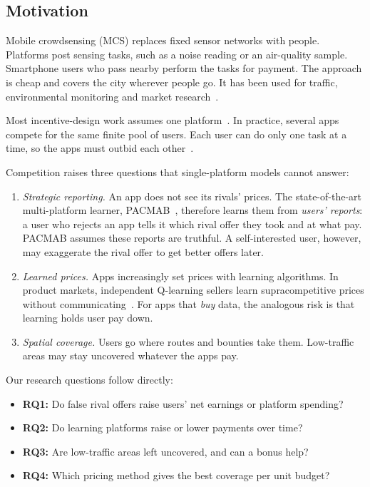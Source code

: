 \documentclass[12pt,draftcls,onecolumn]{IEEEtran}
\begin{document}
\subsection{Motivation}
Mobile crowdsensing (MCS) replaces fixed sensor networks with people. Platforms post sensing tasks, such as a noise reading or an air-quality sample. Smartphone users who pass nearby perform the tasks for payment. The approach is cheap and covers the city wherever people go. It has been used for traffic, environmental monitoring and market research~\cite{li2021mp}.

Most incentive-design work assumes one platform~\cite{yang2012crowdsourcing}. In practice, several apps compete for the same finite pool of users. Each user can do only one task at a time, so the apps must outbid each other~\cite{li2021mp,dongare2026pacmab}.

Competition raises three questions that single-platform models cannot answer:
\begin{enumerate}
\item \emph{Strategic reporting.} An app does not see its rivals' prices. The state-of-the-art multi-platform learner, PACMAB~\cite{dongare2026pacmab}, therefore learns them from \emph{users' reports}: a user who rejects an app tells it which rival offer they took and at what pay. PACMAB assumes these reports are truthful. A self-interested user, however, may exaggerate the rival offer to get better offers later.
\item \emph{Learned prices.} Apps increasingly set prices with learning algorithms. In product markets, independent Q-learning sellers learn supracompetitive prices without communicating~\cite{calvano2020ai}. For apps that \emph{buy} data, the analogous risk is that learning holds user pay down.
\item \emph{Spatial coverage.} Users go where routes and bounties take them. Low-traffic areas may stay uncovered whatever the apps pay.
\end{enumerate}

Our research questions follow directly:
\begin{itemize}
\item \textbf{RQ1:} Do false rival offers raise users' net earnings or platform spending?
\item \textbf{RQ2:} Do learning platforms raise or lower payments over time?
\item \textbf{RQ3:} Are low-traffic areas left uncovered, and can a bonus help?
\item \textbf{RQ4:} Which pricing method gives the best coverage per unit budget?
\end{itemize}
\end{document}
